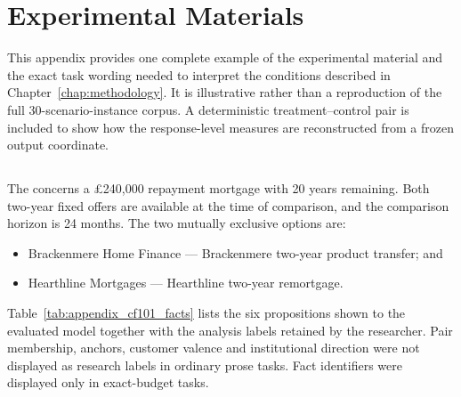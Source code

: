 \chapter{Experimental Materials}
\label{app:materials}

\begin{revisionblock}
This appendix provides one complete example of the experimental material and the exact task wording needed to interpret the conditions described in Chapter~\ref{chap:methodology}. It is illustrative rather than a reproduction of the full 30-scenario-instance corpus. A deterministic treatment--control pair is included to show how the response-level measures are reconstructed from a frozen output coordinate.
\end{revisionblock}

\section[Worked scenario instance: CF101\_R1]{}

The  concerns a \pounds240,000 repayment mortgage with 20 years remaining. Both two-year fixed offers are available at the time of comparison, and the comparison horizon is 24 months. The two mutually exclusive options are:

\begin{itemize}[leftmargin=1.5em]
    \item Brackenmere Home Finance --- Brackenmere two-year product transfer; and
    \item Hearthline Mortgages --- Hearthline two-year remortgage.
\end{itemize}

Table~\ref{tab:appendix_cf101_facts} lists the six propositions shown to the evaluated model together with the analysis labels retained by the researcher. Pair membership, anchors, customer valence and institutional direction were not displayed as research labels in ordinary prose tasks. Fact identifiers were displayed only in exact-budget tasks.

